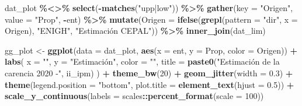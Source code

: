 \documentclass[
  12pt,
]{book}
\newenvironment{Shaded}{\begin{snugshade}}{\end{snugshade}}
\newcommand{\AttributeTok}[1]{\textcolor[rgb]{0.13,0.29,0.53}{#1}}
\newcommand{\DecValTok}[1]{\textcolor[rgb]{0.00,0.00,0.81}{#1}}
\newcommand{\FloatTok}[1]{\textcolor[rgb]{0.00,0.00,0.81}{#1}}
\newcommand{\FunctionTok}[1]{\textcolor[rgb]{0.13,0.29,0.53}{\textbf{#1}}}
\newcommand{\NormalTok}[1]{#1}
\newcommand{\OtherTok}[1]{\textcolor[rgb]{0.56,0.35,0.01}{#1}}
\newcommand{\SpecialCharTok}[1]{\textcolor[rgb]{0.81,0.36,0.00}{\textbf{#1}}}
\newcommand{\StringTok}[1]{\textcolor[rgb]{0.31,0.60,0.02}{#1}}
\begin{document}
\begin{Shaded}
\begin{Highlighting}[]
\NormalTok{  dat\_plot }\SpecialCharTok{\%\textless{}\textgreater{}\%} \FunctionTok{select}\NormalTok{(}\SpecialCharTok{{-}}\FunctionTok{matches}\NormalTok{(}\StringTok{"upp|low"}\NormalTok{)) }\SpecialCharTok{\%\textgreater{}\%}
    \FunctionTok{gather}\NormalTok{(}\AttributeTok{key =} \StringTok{"Origen"}\NormalTok{, }\AttributeTok{value =} \StringTok{"Prop"}\NormalTok{, }\SpecialCharTok{{-}}\NormalTok{ent) }\SpecialCharTok{\%\textgreater{}\%}
    \FunctionTok{mutate}\NormalTok{(}\AttributeTok{Origen =} \FunctionTok{ifelse}\NormalTok{(}\FunctionTok{grepl}\NormalTok{(}\AttributeTok{pattern =} \StringTok{"dir"}\NormalTok{, }\AttributeTok{x =}\NormalTok{ Origen), }\StringTok{"ENIGH"}\NormalTok{, }\StringTok{"Estimación CEPAL"}\NormalTok{)) }\SpecialCharTok{\%\textgreater{}\%}
    \FunctionTok{inner\_join}\NormalTok{(dat\_lim)}
  
\NormalTok{  gg\_plot }\OtherTok{\textless{}{-}}
    \FunctionTok{ggplot}\NormalTok{(}\AttributeTok{data =}\NormalTok{ dat\_plot, }\FunctionTok{aes}\NormalTok{(}\AttributeTok{x =}\NormalTok{ ent, }\AttributeTok{y =}\NormalTok{ Prop, }\AttributeTok{color =}\NormalTok{ Origen)) }\SpecialCharTok{+}
    \FunctionTok{labs}\NormalTok{(}
      \AttributeTok{x =} \StringTok{""}\NormalTok{,}
      \AttributeTok{y =} \StringTok{"Estimación"}\NormalTok{,}
      \AttributeTok{color =} \StringTok{""}\NormalTok{,}
      \AttributeTok{title =} \FunctionTok{paste0}\NormalTok{(}\StringTok{"Estimación de la carencia 2020 {-}"}\NormalTok{, ii\_ipm)}
\NormalTok{    ) }\SpecialCharTok{+}
    \FunctionTok{theme\_bw}\NormalTok{(}\DecValTok{20}\NormalTok{) }\SpecialCharTok{+}
    \FunctionTok{geom\_jitter}\NormalTok{(}\AttributeTok{width =} \FloatTok{0.3}\NormalTok{) }\SpecialCharTok{+}
    \FunctionTok{theme}\NormalTok{(}\AttributeTok{legend.position =} \StringTok{"bottom"}\NormalTok{,}
          \AttributeTok{plot.title =} \FunctionTok{element\_text}\NormalTok{(}\AttributeTok{hjust =} \FloatTok{0.5}\NormalTok{)) }\SpecialCharTok{+}
    \FunctionTok{scale\_y\_continuous}\NormalTok{(}\AttributeTok{labels =}\NormalTok{ scales}\SpecialCharTok{::}\FunctionTok{percent\_format}\NormalTok{(}\AttributeTok{scale =} \DecValTok{100}\NormalTok{))}
  

\end{Highlighting}
\end{Shaded}
\end{document}
